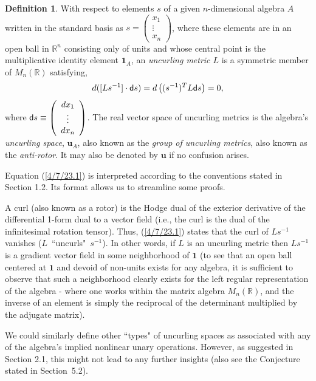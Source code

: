 \documentclass{amsart}
\numberwithin{equation}{section}
\theoremstyle{definition}
\newtheorem{definition}[theorem]{Definition}
\numberwithin{theorem}{section}
\begin{document}
         \begin{definition}\label{7/21/23.1} With respect to elements $s$ of a given $n$-dimensional algebra $A$ written in the standard basis as $s= \left(\begin{array}{ccc}
x_1   \\ 
\vdots \\
x_n   
\end{array}\right)$, where these elements are in an open ball in $\mathbb{R}^n$ consisting only of units and whose central point is the multiplicative identity element $\mathbf{1}_A$, an {\it uncurling metric $L$} is a symmetric member of $M_n(\mathbb{R})$  satisfying, \begin{equation}\label{4/7/23.1} d([Ls^{-1}]\cdot {\sf d}s) = d\left((s^{-1})^T L {\sf d}s\right) = 0, \end{equation} where ${\sf d}s \equiv \left(\begin{array}{ccc}
dx_1   \\ 
\vdots \\
dx_n   
\end{array}\right)$.  The real vector space of uncurling metrics is the algebra's {\it uncurling space}, $\mathbf{u}_A$, also known as the {\it group of uncurling metrics}, also known as the {\it anti-rotor}.  It may also be denoted by $\mathbf{u}$ if no confusion arises.    \end{definition}

Equation (\ref{4/7/23.1}) is interpreted according to the conventions stated in Section 1.2.  Its format allows us to streamline some proofs.

 A curl (also known as a rotor) is the Hodge dual of the exterior derivative of the differential \mbox{1-form} dual to a vector field (i.e., the curl is the dual of the infinitesimal rotation tensor).  Thus,  (\ref{4/7/23.1}) states that the curl of $Ls^{-1}$ vanishes (\mbox{$L$ ``uncurls" $s^{-1}$}).    In other words, if $L$ is an uncurling metric then $Ls^{-1}$ is a gradient vector field in some neighborhood of $\mathbf{1}$ (to see that an open ball centered at $\mathbf{1}$ and devoid of non-units exists for any algebra, it is sufficient to observe that such a neighborhood clearly exists for the left regular representation of the algebra - where one works within the matrix algebra $ M_n(\mathbb{R})$, and the inverse of an element is simply the reciprocal of the determinant multiplied by the adjugate matrix).
 
 We could similarly define other ``types" of uncurling spaces as associated with any of the algebra's implied nonlinear unary operations.  However, as suggested in Section 2.1, this might not lead to any further insights (also see the Conjecture stated in \mbox{Section 5.2}).  
 
\end{document}
